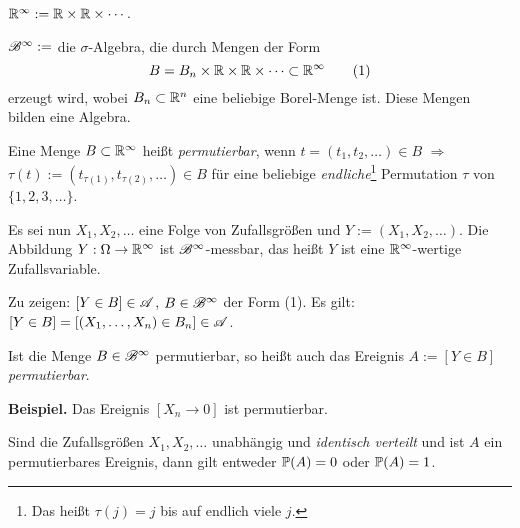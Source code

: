 \begin{defn}
  $\mathbb{R}^\infty := \mathbb{R} \times \mathbb{R} \times \cdots$.

  $\mathscr{B}^\infty :=$ die $\sigma$-Algebra, die durch Mengen der Form
  \[ B = B_n \times \mathbb{R} \times \mathbb{R} \times \cdots \subset \mathbb{R}^\infty
    \tag{1} \]
  erzeugt wird, wobei $B_n \subset \mathbb{R}^n$ eine beliebige Borel-Menge ist.
  Diese Mengen bilden eine Algebra.

  Eine Menge $B \subset \mathbb{R}^\infty$ heißt \emph{permutierbar}, wenn $t = (t_1,
  t_2, \ldots) \in B$ $\Rightarrow$ $\tau(t) := (t_{\tau(1)}, t_{\tau(2)},
  \ldots) \in B$ für eine beliebige \emph{endliche}\footnote{%
    Das heißt $\tau(j) = j$ bis auf endlich viele $j$.}
  Permutation $\tau$ von $\{ 1, 2, 3, \ldots \}$.

  Es sei nun $X_1, X_2, \ldots$ eine Folge von Zufallsgrößen und $Y := (X_1,
  X_2, \ldots )$. Die Abbildung $Y: \Omega \to \mathbb{R}^\infty$ ist
  $\mathscr{B}^\infty$-messbar, das heißt $Y$ ist eine $\mathbb{R}^\infty$-wertige
  Zufallsvariable.

  Zu zeigen: $[Y \in B] \in \mathscr{A}$, $B \in \mathscr{B}^\infty$ der Form (1). Es gilt:
  $[Y \in B] = [(X_1, \ldots, X_n) \in B_n] \in \mathscr{A}$.

  Ist die Menge $B \in \mathscr{B}^\infty$ permutierbar, so heißt auch das Ereignis
  $A := [ Y \in B]$ \emph{permutierbar}.

  \textbf{Beispiel.} Das Ereignis $[X_n \to 0]$ ist permutierbar.
\end{defn}

\clearpage

\begin{thm}
  Sind die Zufallsgrößen $X_1, X_2, \ldots$ unabhängig und \emph{identisch
    verteilt} und ist $A$ ein permutierbares Ereignis, dann gilt entweder
  $\mathbb{P}(A) = 0$ oder $\mathbb{P}(A) = 1$.
\end{thm}

